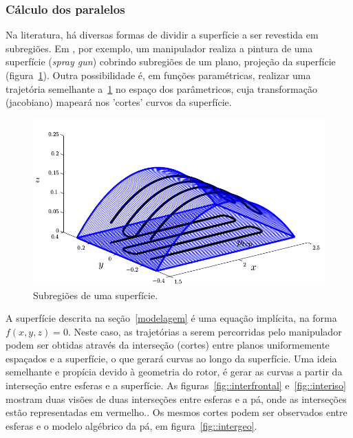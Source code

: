 \subsubsection{Cálculo dos paralelos}
Na literatura, há diversas formas de dividir a superfície a ser revestida em
subregiões. Em \cite{from2010off}, por exemplo, um manipulador realiza a pintura
de uma superfície (\textit{spray gun}) cobrindo subregiões de um plano, projeção
da superfície (figura~\ref{fig::pal}). Outra possibilidade é, em funções
paramétricas, realizar uma trajetória semelhante a~\ref{fig::pal} no espaço dos
parâmetricos, cuja transformação (jacobiano) mapeará nos 'cortes' curvos da
superfície.

\begin{figure}[!ht]
	\centering	
	\includegraphics[width=\columnwidth]{figs/planejamento/pal.png}
	\caption{Subregiões de uma superfície.}
	\label{fig::pal}
\end{figure}


A superfície descrita na seção~\ref{modelagem} é uma equação implícita, na forma
$f(x,y,z)=0$. Neste caso, as trajetórias a serem percorridas pelo manipulador
podem ser obtidas através da interseção (cortes) entre planos uniformemente
espaçados e a superfície, o que gerará curvas ao longo da superfície. Uma ideia
semelhante e propícia devido à geometria do rotor, é gerar as curvas a partir da interseção
entre esferas e a superfície. As figuras~\ref{fig::interfrontal}
e~\ref{fig::interiso} mostram duas visões de duas interseções entre esferas e
a pá, onde as interseções estão representadas em vermelho.. Os mesmos cortes
podem ser observados entre esferas e o modelo algébrico da pá, em figura~\ref{fig::intergeo}.


